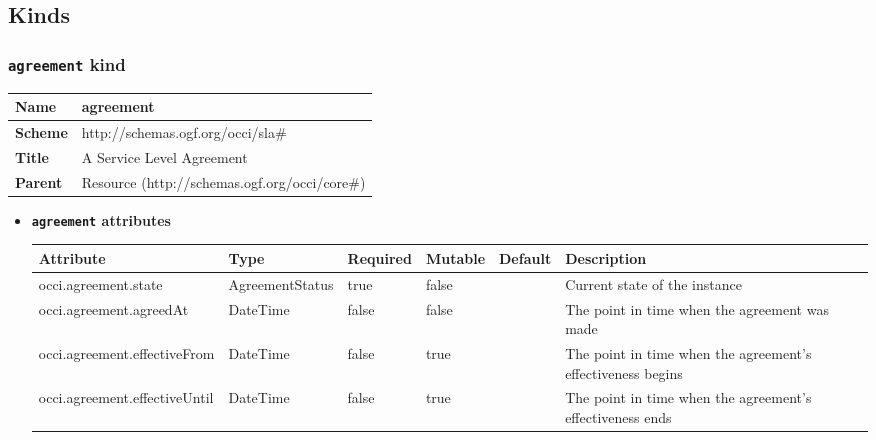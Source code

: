 \subsection{Kinds}
\subsubsection{\texttt{agreement} kind}
\begin{center}
\begin{tabular}{|l|l|}
  \hline
  \textbf{Name} & agreement \\
  \hline  
  \textbf{Scheme} & http://schemas.ogf.org/occi/sla\# \\
  \hline
  \textbf{Title} & A Service Level Agreement \\
  \hline
  \textbf{Parent} & Resource (http://schemas.ogf.org/occi/core\#) \\
  \hline
\end{tabular}
\end{center}
\begin{itemize}
\item \textbf{\texttt{agreement} attributes}

\begin{tabularx}{\textwidth}{|l|l|p{1.4cm}|p{1.3cm}|l|X|}
  \hline
  \textbf{Attribute} & \textbf{Type} & \textbf{Required} & \textbf{Mutable} & \textbf{Default} & \textbf{Description} \\
  \hline  
  occi.agreement.state & AgreementStatus & true & false &  & Current state of the instance \\
  \hline
  occi.agreement.agreedAt & DateTime & false & false &  & The point in time when the agreement was made \\
  \hline
  occi.agreement.effectiveFrom & DateTime & false & true &  & The point in time when the agreement’s effectiveness begins \\
  \hline
  occi.agreement.effectiveUntil & DateTime & false & true &  & The point in time when the agreement’s effectiveness ends \\
  \hline
\end{tabularx}
\end{itemize}

